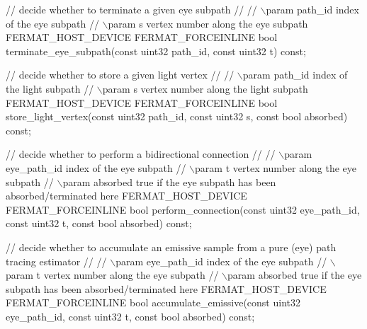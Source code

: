 \begin{DoxyParagraph}{}
\begin{DoxyEnumerate}
\begin{DoxyCode}
   \textcolor{comment}{// decide whether to terminate a given eye subpath}
   \textcolor{comment}{//}
   \textcolor{comment}{// \(\backslash\)param path\_id           index of the eye subpath}
   \textcolor{comment}{// \(\backslash\)param s             vertex number along the eye subpath}
   FERMAT\_HOST\_DEVICE FERMAT\_FORCEINLINE
   \textcolor{keywordtype}{bool} terminate\_eye\_subpath(\textcolor{keyword}{const} uint32 path\_id, \textcolor{keyword}{const} uint32 t) \textcolor{keyword}{const};

   \textcolor{comment}{// decide whether to store a given light vertex}
   \textcolor{comment}{//}
   \textcolor{comment}{// \(\backslash\)param path\_id           index of the light subpath}
   \textcolor{comment}{// \(\backslash\)param s             vertex number along the light subpath}
   FERMAT\_HOST\_DEVICE FERMAT\_FORCEINLINE
   \textcolor{keywordtype}{bool} store\_light\_vertex(\textcolor{keyword}{const} uint32 path\_id, \textcolor{keyword}{const} uint32 s, \textcolor{keyword}{const} \textcolor{keywordtype}{bool} absorbed) \textcolor{keyword}{const};

   \textcolor{comment}{// decide whether to perform a bidirectional connection}
   \textcolor{comment}{//}
   \textcolor{comment}{// \(\backslash\)param eye\_path\_id       index of the eye subpath}
   \textcolor{comment}{// \(\backslash\)param t             vertex number along the eye subpath}
   \textcolor{comment}{// \(\backslash\)param absorbed          true if the eye subpath has been absorbed/terminated here}
   FERMAT\_HOST\_DEVICE FERMAT\_FORCEINLINE
   \textcolor{keywordtype}{bool} perform\_connection(\textcolor{keyword}{const} uint32 eye\_path\_id, \textcolor{keyword}{const} uint32 t, \textcolor{keyword}{const} \textcolor{keywordtype}{bool} absorbed) \textcolor{keyword}{const};

   \textcolor{comment}{// decide whether to accumulate an emissive sample from a pure (eye) path tracing estimator}
   \textcolor{comment}{//}
   \textcolor{comment}{// \(\backslash\)param eye\_path\_id       index of the eye subpath}
   \textcolor{comment}{// \(\backslash\)param t             vertex number along the eye subpath}
   \textcolor{comment}{// \(\backslash\)param absorbed          true if the eye subpath has been absorbed/terminated here}
   FERMAT\_HOST\_DEVICE FERMAT\_FORCEINLINE
   \textcolor{keywordtype}{bool} accumulate\_emissive(\textcolor{keyword}{const} uint32 eye\_path\_id, \textcolor{keyword}{const} uint32 t, \textcolor{keyword}{const} \textcolor{keywordtype}{bool} absorbed) \textcolor{keyword}{const};


\end{DoxyCode}
\end{DoxyEnumerate}
\end{DoxyParagraph}
